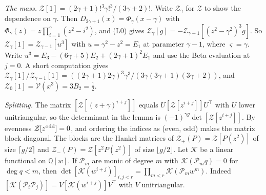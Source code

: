 \documentclass[11pt]{amsart}
\theoremstyle{definition}
\theoremstyle{remark}
\numberwithin{equation}{section}
\newcommand{\Q}{\mathbb Q}
\begin{document}
\emph{The mass.} $\mathcal Z[1]=(2\gamma+1)!^3\gamma!^3/(3\gamma+2)!$. Write $\mathcal Z_\gamma$ for $\mathcal Z$
to show the dependence on $\gamma$. Then $D_{2\gamma+1}(x)=\Phi_\gamma(x-\gamma)$ with $\Phi_\gamma(z)=z\prod_{i=1}^\gamma(z^2-i^2)$, and (L0) gives
$\mathcal Z_\gamma[g]=-\mathcal Z_{\gamma-1}[(z^2-\gamma^2)^3g]$. So $\mathcal Z_\gamma[1]=\mathcal Z_{\gamma-1}[u^3]$ with $u=\gamma^2-z^2=E_1$ at parameter $\gamma-1$, where $\varsigma=\gamma$. Write $u^3=E_3-(6\gamma+5)E_2+(2\gamma+1)^2E_1$ and use the Beta evaluation at $j=0$. A short computation gives
$\mathcal Z_\gamma[1]/\mathcal Z_{\gamma-1}[1]=((2\gamma+1)2\gamma)^3\gamma^3/(3\gamma(3\gamma+1)(3\gamma+2))$, and $\mathcal Z_0[1]=\mathcal V(x^3)=3B_2=\frac12$.

\emph{Splitting.} The matrix $[\mathcal Z[(z+\gamma)^{i+j}]]$ equals $U[\mathcal Z[z^{i+j}]]U^\top$ with $U$ lower unitriangular, so the determinant in the lemma is $(-1)^{\gamma g}\det[\mathcal Z[z^{i+j}]]$. By evenness $\mathcal Z[z^{\rm odd}]=0$, and ordering the indices as (even, odd) makes the matrix block diagonal. The blocks are the Hankel matrices of
$\mathcal Z_+(P)=\mathcal Z[P(z^2)]$ of size $\lceil g/2\rceil$ and $\mathcal Z_-(P)=\mathcal Z[z^2P(z^2)]$ of size $\lfloor g/2\rfloor$. Let $\mathcal K$ be a linear functional on $\Q[w]$. If $\mathcal P_m$ are monic of degree $m$ with $\mathcal K(\mathcal P_mq)=0$ for $\deg q<m$, then $\det[\mathcal K(w^{i+j})]_{i,j<r}=\prod_{m<r}\mathcal K(\mathcal P_mw^m)$. Indeed $[\mathcal K(\mathcal P_i\mathcal P_j)]=V[\mathcal K(w^{i+j})]V^\top$ with $V$ unitriangular.
\end{document}
